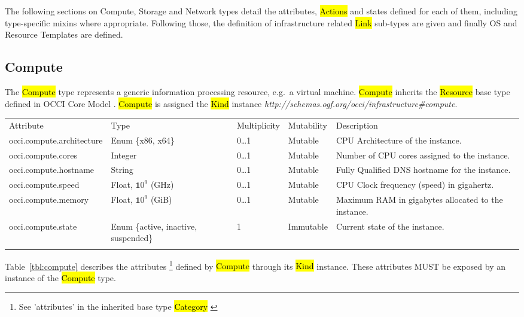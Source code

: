 \documentclass[10pt,a4paper]{article}
\begin{document}
The following sections on Compute, Storage and Network types detail the attributes, 
\hl{Actions} and states defined for each of them, including type-specific mixins where 
appropriate. Following those, the definition of infrastructure related \hl{Link} sub-types 
are given and finally OS and Resource Templates are defined.

\subsection{Compute}
The \hl{Compute} type represents a generic information processing resource, e.g.~a
virtual machine. \hl{Compute} inherits the \hl{Resource} base type defined in
OCCI Core Model \cite{occi:core}.
\hl{Compute} is assigned the \hl{Kind} instance
\textit{http://schemas.ogf.org/occi/infrastructure\#compute}.

	{
		\begin{tabular}{lp{2.5cm}p{1cm}lp{6cm}}
		\toprule
		Attribute&Type&Multi\-plicity&Mutability&Description\\
		\colrule
		occi.compute.architecture & Enum \{x86, x64\} & 0\ldots1 
		& Mutable & CPU Architecture of the instance.\\
		occi.compute.cores & Integer & 0\ldots1 & Mutable 
		& Number of CPU cores assigned to the instance.\\
		occi.compute.hostname & String & 0\ldots1 
		& Mutable & Fully Qualified DNS hostname for the instance.\\
		occi.compute.speed & Float, ${\mathbf 10}^9$ (GHz) & 0\ldots1 
		& Mutable & CPU Clock frequency (speed) in gigahertz.\\
		occi.compute.memory & Float, ${\mathbf 10}^9$ (GiB) & 0\ldots1 
		& Mutable & Maximum RAM in gigabytes allocated to the instance.\\
		occi.compute.state & Enum \{active, inactive, suspended\} & 1 
		& Immutable & Current state of the instance.\\
		\botrule
		\end{tabular}
	}

Table~\ref{tbl:compute} describes the attributes \footnote{See ’attributes’ in the inherited 
base type \hl{Category}  \cite{occi:core}} 
defined by \hl{Compute} through its \hl{Kind} instance. These attributes
MUST be exposed by an instance of the \hl{Compute} type.
\end{document}
